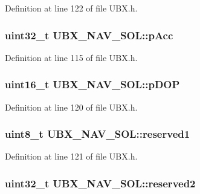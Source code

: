 \-Definition at line 122 of file \-U\-B\-X.\-h.

\hypertarget{struct_u_b_x___n_a_v___s_o_l_af472e94738185b263cbfb4bffcca13ff}{
\subsubsection[{p\-Acc}]{\setlength{\rightskip}{0pt plus 5cm}uint32\-\_\-t {\bf \-U\-B\-X\-\_\-\-N\-A\-V\-\_\-\-S\-O\-L\-::p\-Acc}}}\label{struct_u_b_x___n_a_v___s_o_l_af472e94738185b263cbfb4bffcca13ff}


\-Definition at line 115 of file \-U\-B\-X.\-h.

\hypertarget{struct_u_b_x___n_a_v___s_o_l_ac6ab9d0036a83196d847e1c4ed2389fb}{
\subsubsection[{p\-D\-O\-P}]{\setlength{\rightskip}{0pt plus 5cm}uint16\-\_\-t {\bf \-U\-B\-X\-\_\-\-N\-A\-V\-\_\-\-S\-O\-L\-::p\-D\-O\-P}}}\label{struct_u_b_x___n_a_v___s_o_l_ac6ab9d0036a83196d847e1c4ed2389fb}


\-Definition at line 120 of file \-U\-B\-X.\-h.

\hypertarget{struct_u_b_x___n_a_v___s_o_l_aa1df4884b23e42bf16bc237341d5001c}{
\subsubsection[{reserved1}]{\setlength{\rightskip}{0pt plus 5cm}uint8\-\_\-t {\bf \-U\-B\-X\-\_\-\-N\-A\-V\-\_\-\-S\-O\-L\-::reserved1}}}\label{struct_u_b_x___n_a_v___s_o_l_aa1df4884b23e42bf16bc237341d5001c}


\-Definition at line 121 of file \-U\-B\-X.\-h.

\hypertarget{struct_u_b_x___n_a_v___s_o_l_a2367f145076ebc428ec4ef901cdda367}{
\subsubsection[{reserved2}]{\setlength{\rightskip}{0pt plus 5cm}uint32\-\_\-t {\bf \-U\-B\-X\-\_\-\-N\-A\-V\-\_\-\-S\-O\-L\-::reserved2}}}\label{struct_u_b_x___n_a_v___s_o_l_a2367f145076ebc428ec4ef901cdda367}


